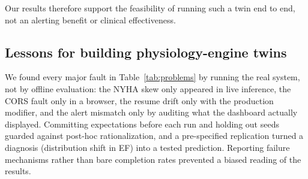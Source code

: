\documentclass[conference]{IEEEtran}
\begin{document}
Our results therefore support the feasibility of running such a twin end to end, not an alerting benefit or clinical effectiveness.

\subsection{Lessons for building physiology-engine twins}
We found every major fault in Table~\ref{tab:problems} by running the real system, not by offline evaluation: the NYHA skew only appeared in live inference, the CORS fault only in a browser, the resume drift only with the production modifier, and the alert mismatch only by auditing what the dashboard actually displayed. Committing expectations before each run and holding out seeds guarded against post-hoc rationalization, and a pre-specified replication turned a diagnosis (distribution shift in EF) into a tested prediction. Reporting failure mechanisms rather than bare completion rates prevented a biased reading of the results.
\end{document}

